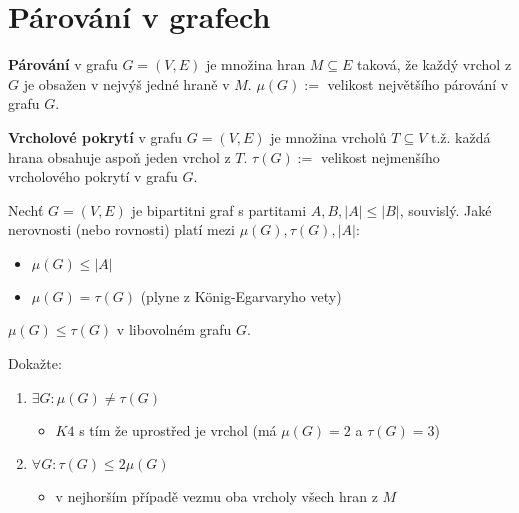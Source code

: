 \chapter{Párování v grafech}

\begin{definice}
	\textbf{Párování} v grafu $G=(V,E)$ je množina hran $M \subseteq E$ taková, že každý vrchol z $G$ je obsažen v nejvýš jedné hraně v $M$. $\mu (G) :=$ velikost největšího párování v grafu $G$.
\end{definice}

\begin{definice}
	\textbf{Vrcholové pokrytí} v grafu $G=(V,E)$ je množina vrcholů $T \subseteq V$ t.ž. každá hrana obsahuje aspoň jeden vrchol z $T$. $\tau (G) :=$ velikost nejmenšího vrcholového pokrytí v grafu $G$.
\end{definice}

\begin{cvic}
	Nechť $G=(V,E)$ je bipartitni graf s partitami $A,B, |A| \leq |B|$, souvislý. Jaké nerovnosti (nebo rovnosti) platí mezi $\mu (G), \tau (G), |A|$:
	
	\begin{itemize}
		\item $\mu (G) \leq |A|$
		\item $\mu (G) = \tau (G)$ (plyne z König-Egarvaryho vety)
	\end{itemize}
\end{cvic}

\begin{pozor}
	$\mu (G) \leq \tau (G)$ v libovolném grafu $G$.
\end{pozor}

\begin{cvic}
	Dokažte:
	
	\begin{enumerate}
		\item $\exists G: \mu (G) \neq \tau (G)$
		\begin{itemize}
			\item $K4$ s tím že uprostřed je vrchol (má $\mu (G) = 2$ a $\tau (G) = 3$)
		\end{itemize}
		\item $\forall G: \tau (G) \leq 2 \mu (G)$
		\begin{itemize}
			\item v nejhorším případě vezmu oba vrcholy všech hran z $M$
		\end{itemize}
	\end{enumerate}
\end{cvic}

